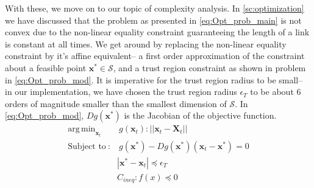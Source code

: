\documentclass[12pt,a4]{article}
\DeclareMathOperator*{\argmin}{arg\,min}
\begin{document}
With these, we move on to our topic of complexity analysis. In \cref{sc:optimization} we have discussed that the problem as presented in \cref{eq:Opt_prob_main} is not  convex due to the non-linear equality constraint guaranteeing the length of a link is constant at all times. We get around by replacing the non-linear equality constraint by it's affine equivalent-- a first order approximation of the constraint about a feasible point $\textbf{x}^* \in \mathcal{S}$, and a trust region constraint as shown in problem in \cref{eq:Opt_prob_mod}. It is imperative for the trust region radius to be small-- in our implementation, we have chosen the trust region radius $\epsilon_T$ to be about 6 orders of magnitude smaller than the smallest dimension of $\mathcal{S}$. In \cref{eq:Opt_prob_mod}, $Dg(\textbf{x}^*)$ is the Jacobian of the objective function. 
\begin{align}\label{eq:Opt_prob_mod}
 \argmin_{\textbf{x}_t} & ~g(\textbf{x}_t): \vert \vert \textbf{x}_t-\textbf{X}_t\vert \vert\\
\text{Subject to}~: &~ g(\textbf{x}^*)-Dg(\textbf{x}^*) (\textbf{x}_t-\textbf{x}^*) =0\nonumber\\ 
					& | \textbf{x}^*-\textbf{x}_t| \preceq  \epsilon_T \nonumber\\
					& C_{ineq}: f(x) \preceq 0 \nonumber
\end{align}
\end{document}
